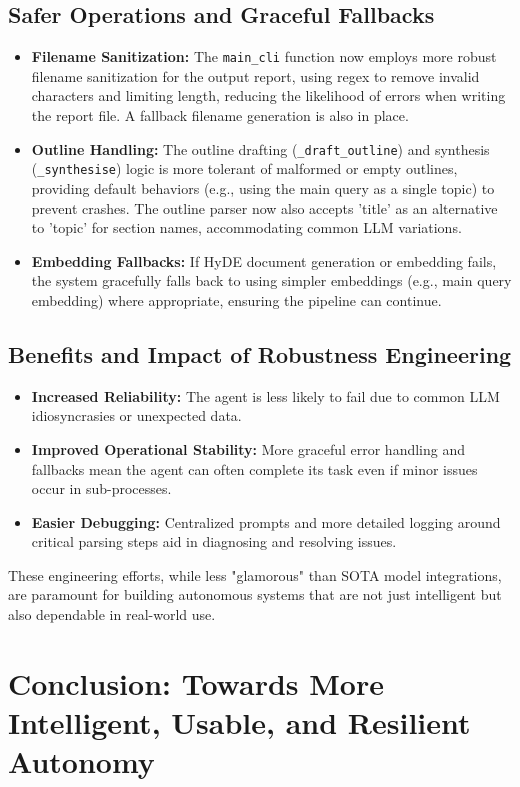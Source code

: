 \documentclass[12pt, a4paper]{article}
\begin{document}
\subsection{Safer Operations and Graceful Fallbacks}
\begin{itemize}
    \item \textbf{Filename Sanitization:} The \verb|main_cli| function now employs more robust filename sanitization for the output report, using regex to remove invalid characters and limiting length, reducing the likelihood of errors when writing the report file. A fallback filename generation is also in place.
    \item \textbf{Outline Handling:} The outline drafting (\verb|_draft_outline|) and synthesis (\verb|_synthesise|) logic is more tolerant of malformed or empty outlines, providing default behaviors (e.g., using the main query as a single topic) to prevent crashes. The outline parser now also accepts 'title' as an alternative to 'topic' for section names, accommodating common LLM variations.
    \item \textbf{Embedding Fallbacks:} If HyDE document generation or embedding fails, the system gracefully falls back to using simpler embeddings (e.g., main query embedding) where appropriate, ensuring the pipeline can continue.
\end{itemize}

\subsection{Benefits and Impact of Robustness Engineering}
\begin{itemize}
    \item \textbf{Increased Reliability:} The agent is less likely to fail due to common LLM idiosyncrasies or unexpected data.
    \item \textbf{Improved Operational Stability:} More graceful error handling and fallbacks mean the agent can often complete its task even if minor issues occur in sub-processes.
    \item \textbf{Easier Debugging:} Centralized prompts and more detailed logging around critical parsing steps aid in diagnosing and resolving issues.
\end{itemize}
These engineering efforts, while less "glamorous" than SOTA model integrations, are paramount for building autonomous systems that are not just intelligent but also dependable in real-world use.

\section{Conclusion: Towards More Intelligent, Usable, and Resilient Autonomy}
\end{document}
